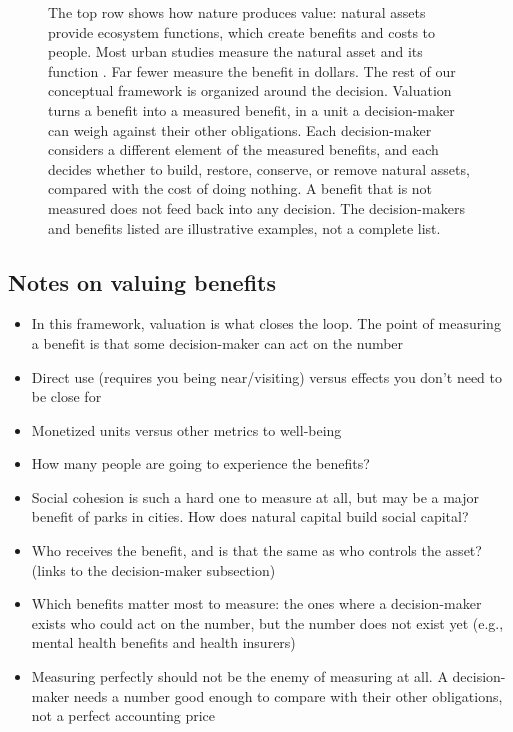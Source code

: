 \documentclass[12pt]{article}
\begin{document}
\begin{figure}[htbp]
\vspace{0.5em}
\begin{minipage}[t]{0.8\textwidth}
\justifying
\footnotesize \noindent The top row shows how nature produces value: natural assets provide ecosystem functions, which create benefits and costs to people. Most urban studies measure the natural asset and its function \citep{veerkampReviewStudiesAssessing2021}. Far fewer measure the benefit in dollars. The rest of our conceptual framework is organized around the decision. Valuation turns a benefit into a measured benefit, in a unit a decision-maker can weigh against their other obligations. Each decision-maker considers a different element of the measured benefits, and each decides whether to build, restore, conserve, or remove natural assets, compared with the cost of doing nothing. A benefit that is not measured does not feed back into any decision. The decision-makers and benefits listed are illustrative examples, not a complete list.
\end{minipage}
\end{figure}


\subsection{Notes on valuing benefits}
\begin{itemize}
  \item In this framework, valuation is what closes the loop. The point of measuring a benefit is that some decision-maker can act on the number
  \item Direct use (requires you being near/visiting) versus effects you don't need to be close for
  \item Monetized units versus other metrics to well-being
  \item How many people are going to experience the benefits?
  \item Social cohesion is such a hard one to measure at all, but may be a major benefit of parks in cities. How does natural capital build social capital? 
  \item Who receives the benefit, and is that the same as who controls the asset? (links to the decision-maker subsection)
  \item Which benefits matter most to measure: the ones where a decision-maker exists who could act on the number, but the number does not exist yet (e.g., mental health benefits and health insurers)
  \item Measuring perfectly should not be the enemy of measuring at all. A decision-maker needs a number good enough to compare with their other obligations, not a perfect accounting price
\end{itemize}
\end{document}
